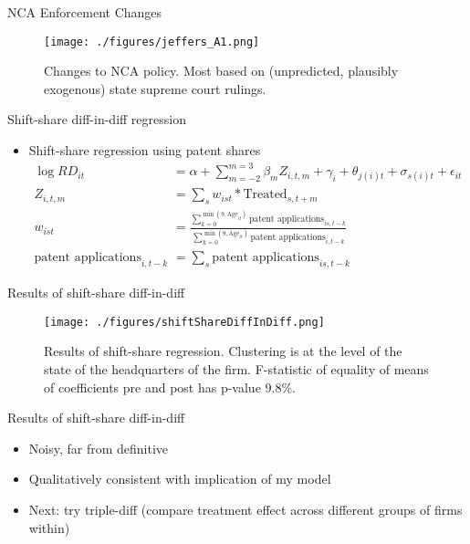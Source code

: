 \documentclass[english,usenames,dvipsnames]{beamer}
\begin{document}
\begin{frame}{NCA Enforcement Changes}
\begin{figure}	
	\texttt{[image: ./figures/jeffers\_A1.png]}
	\caption{Changes to NCA policy. Most based on (unpredicted, plausibly exogenous) state supreme court rulings.}
\end{figure}
\end{frame}




\begin{frame}{Shift-share diff-in-diff regression}
\begin{itemize}
	\item Shift-share regression using patent shares 
	\small
	\begin{align}
	\log RD_{it} &= \alpha + \sum_{m=-2}^{m=3} \beta_m Z_{i,t,m} + \gamma_i + \theta_{j(i)t} + \sigma_{s(i)t} + \epsilon_{it} \nonumber\\
	Z_{i,t,m} &= \sum_s w_{ist} * \textrm{Treated}_{s,t+m} \nonumber \\
	w_{ist} &= \frac{\sum_{k=0}^{\min(9,\textrm{Age}_{it})} \textrm{patent applications}_{is,t-k}}{\sum_{k=0}^{\min(9,\textrm{Age}_{it})} \textrm{patent applications}_{i,t-k}} \nonumber  \\
	\textrm{patent applications}_{i,t-k} &= \sum_s \textrm{patent applications}_{is,t-k} \nonumber
	\end{align}	
\end{itemize}
\end{frame}

\begin{frame}{Results of shift-share diff-in-diff}
\begin{figure}
	\texttt{[image: ./figures/shiftShareDiffInDiff.png]}
	\caption{Results of shift-share regression. Clustering is at the level of the state of the headquarters of the firm. F-statistic of equality of means of coefficients pre and post has p-value 9.8\%.}
\end{figure}
\end{frame}

\begin{frame}{Results of shift-share diff-in-diff}
\begin{itemize}
	\item Noisy, far from definitive
	\item Qualitatively consistent with implication of my model
	\item Next: try triple-diff (compare treatment effect across different groups of firms within)
\end{itemize}
\end{frame}
\end{document}
